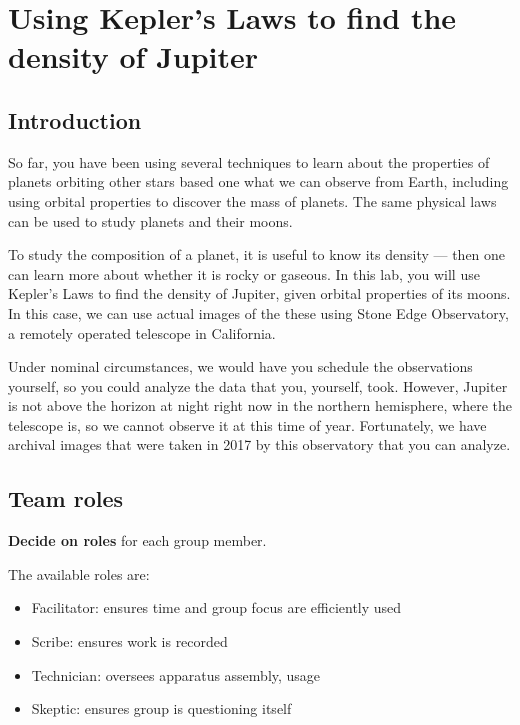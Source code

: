 \chapter{Using Kepler’s Laws to find the density of Jupiter}


\section{Introduction}

So far, you have been using several techniques to learn about the properties of planets orbiting other stars based one what we can observe from Earth, including using orbital properties to discover the mass of planets. The same physical laws can be used to study planets and their moons.

To study the composition of a planet, it is useful to know its density --- then one can learn more about whether it is rocky or gaseous. In this lab, you will use Kepler's Laws to find the density of Jupiter, given orbital properties of its moons. In this case, we can use actual images of the these using Stone Edge Observatory, a remotely operated telescope in California.

Under nominal circumstances, we would have you schedule the observations yourself, so you could analyze the data that you, yourself, took. However,%
Jupiter is not above the horizon at night right now in the northern hemisphere, where the telescope is, so we cannot observe it at this time of year.
Fortunately, we have archival images that were taken in 2017 by this observatory that you can analyze.

\section{Team roles}

\begin{steps}
	\item \textbf{Decide on roles} for each group member.
\end{steps}

The available roles are:
\begin{itemize}
	\item Facilitator: ensures time and group focus are efficiently used
	\item Scribe: ensures work is recorded
	\item Technician: oversees apparatus assembly, usage
	\item Skeptic: ensures group is questioning itself
\end{itemize}

